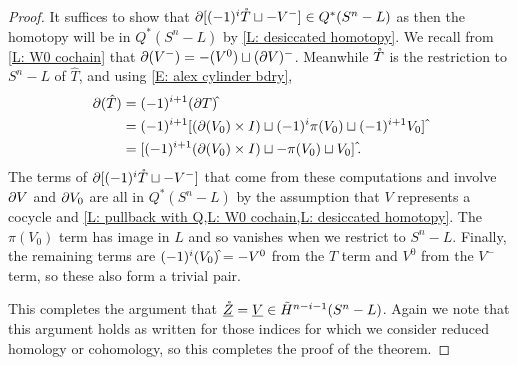 \begin{proof}
	It suffices to show that $\partial[(-1)^i\mathring{T} \sqcup - V^-] \in Q^*(S^n-L)$ as then the homotopy will be in $Q^*(S^n-L)$ by \cref{L: desiccated homotopy}.
	We recall from \cref{L: W0 cochain} that $\partial(V^-) = -(V^0) \sqcup (\partial V)^-$.
	Meanwhile $\mathring{T}$ is the restriction to $S^n - L$ of $\hat T$, and using \eqref{E: alex cylinder bdry},
	\begin{align*}
		\bd (\hat T) &= (-1)^{i+1}(\bd T)\hat{\vrule height1.3ex width0pt}\\
		&=(-1)^{i+1}[(\bd (V_0) \times I) \sqcup (-1)^i\pi(V_0)\sqcup (-1)^{i+1} V_0]\,\hat{\vrule height1.3ex width0pt}\\
		&=[(-1)^{i+1}(\bd (V_0) \times I) \sqcup -\pi(V_0)\sqcup V_0]\,\hat{\vrule height1.3ex width0pt}.
	\end{align*}
	The terms of $\partial[ (-1)^i\mathring{T} \sqcup - V^-]$ that come from these computations and involve $\partial V$ and $\partial V_0$ are all in $Q^*(S^n-L)$ by the assumption that $V$ represents a cocycle and \cref{L: pullback with Q,L: W0 cochain,L: desiccated homotopy}.
	The $\pi(V_0)$ term has image in $L$ and so vanishes when we restrict to $S^n - L$.
	Finally, the remaining terms are $(-1)^i(V_0)\hat{\vrule height1.3ex width0pt} = -V^0$ from the $T$ term and $V^0$ from the $V^-$ term, so these also form a trivial pair.

	This completes the argument that $\underline{\mathring{Z}} = \underline{V} \in \tilde H^{n-i-1}(S^n - L)$.
	Again we note that this argument holds as written for those indices for which we consider reduced homology or cohomology, so this completes the proof of the theorem.
\end{proof}


